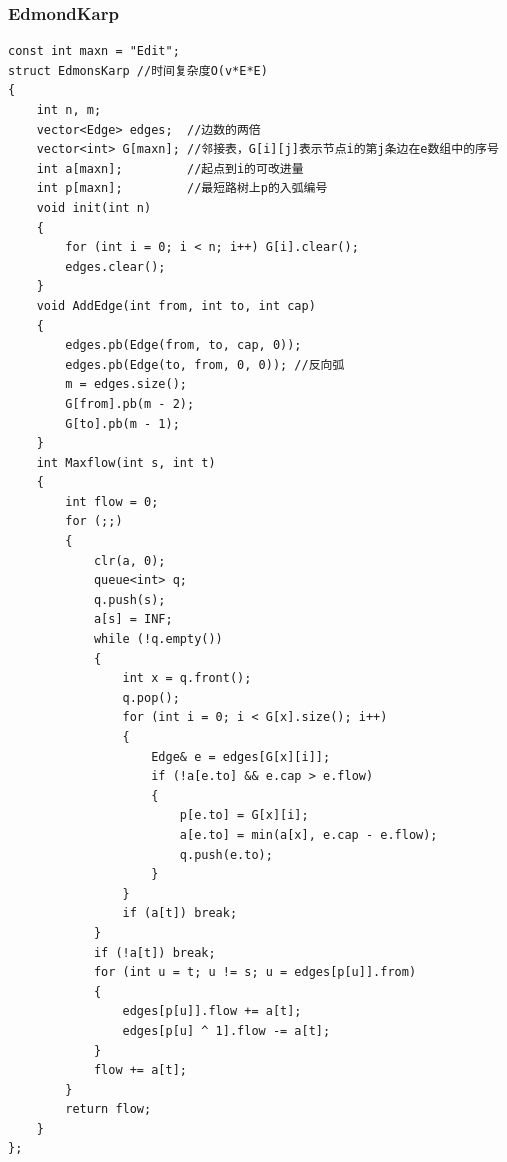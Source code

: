 \documentclass[twoside]{article}
\begin{document}
\subsubsection{EdmondKarp}
\begin{lstlisting}
const int maxn = "Edit";
struct EdmonsKarp //时间复杂度O(v*E*E)
{
    int n, m;
    vector<Edge> edges;  //边数的两倍
    vector<int> G[maxn]; //邻接表，G[i][j]表示节点i的第j条边在e数组中的序号
    int a[maxn];         //起点到i的可改进量
    int p[maxn];         //最短路树上p的入弧编号
    void init(int n)
    {
        for (int i = 0; i < n; i++) G[i].clear();
        edges.clear();
    }
    void AddEdge(int from, int to, int cap)
    {
        edges.pb(Edge(from, to, cap, 0));
        edges.pb(Edge(to, from, 0, 0)); //反向弧
        m = edges.size();
        G[from].pb(m - 2);
        G[to].pb(m - 1);
    }
    int Maxflow(int s, int t)
    {
        int flow = 0;
        for (;;)
        {
            clr(a, 0);
            queue<int> q;
            q.push(s);
            a[s] = INF;
            while (!q.empty())
            {
                int x = q.front();
                q.pop();
                for (int i = 0; i < G[x].size(); i++)
                {
                    Edge& e = edges[G[x][i]];
                    if (!a[e.to] && e.cap > e.flow)
                    {
                        p[e.to] = G[x][i];
                        a[e.to] = min(a[x], e.cap - e.flow);
                        q.push(e.to);
                    }
                }
                if (a[t]) break;
            }
            if (!a[t]) break;
            for (int u = t; u != s; u = edges[p[u]].from)
            {
                edges[p[u]].flow += a[t];
                edges[p[u] ^ 1].flow -= a[t];
            }
            flow += a[t];
        }
        return flow;
    }
};
\end{lstlisting}
\end{document}
